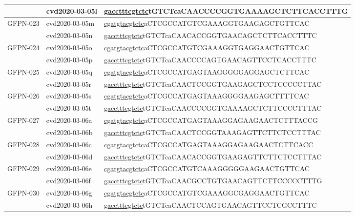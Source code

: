 \begin{landscape}
\begin{longtable}{|l|l|l|}
		& cvd2020-03-05l & \underline{gaccttt\underline{cgtctc}}tGTCTcaCAACCCCGGTGAAAAGCTCTTCACCTTTG  \\ \hline
		\multirow{2}{*}{GFPN-023} & cvd2020-03-05m & \underline{cgatgta\underline{cgtctc}}aCTCGCCATGTCGAAAGGTGAAGAGCTGTTCAC     \\ \cline{2-3} 
		& cvd2020-03-05n & \underline{gaccttt\underline{cgtctc}}tGTCTcaCAACACCGGTGAACAGCTCTTCACCTTTC  \\ \hline
		\multirow{2}{*}{GFPN-024} & cvd2020-03-05o & \underline{cgatgta\underline{cgtctc}}aCTCGCCATGTCGAAAGGTGAGGAACTGTTCAC     \\ \cline{2-3} 
		& cvd2020-03-05p & \underline{gaccttt\underline{cgtctc}}tGTCTcaCAACCCCAGTGAACAGTTCCTCACCTTTC  \\ \hline
		\multirow{2}{*}{GFPN-025} & cvd2020-03-05q & \underline{cgatgta\underline{cgtctc}}aCTCGCCATGAGTAAGGGGGAGGAGCTCTTCAC     \\ \cline{2-3} 
		& cvd2020-03-05r & \underline{gaccttt\underline{cgtctc}}tGTCTcaCAACTCCGGTGAAGAGCTCCTCCCCCTTAC \\ \hline
		\multirow{2}{*}{GFPN-026} & cvd2020-03-05s & \underline{cgatgta\underline{cgtctc}}aCTCGCCATGAGTAAAGGGGAAGAGCTTTTCAC     \\ \cline{2-3} 
		& cvd2020-03-05t & \underline{gaccttt\underline{cgtctc}}tGTCTcaCAACCCCGGTGAAAAGCTCTTCCCCTTTAC \\ \hline
		\multirow{2}{*}{GFPN-027} & cvd2020-03-06a & \underline{cgatgta\underline{cgtctc}}aCTCGCCATGAGTAAAGGAGAAGAACTCTTTACCG   \\ \cline{2-3} 
		& cvd2020-03-06b & \underline{gaccttt\underline{cgtctc}}tGTCTcaCAACTCCGGTAAAGAGTTCTTCTCCTTTAC \\ \hline
		\multirow{2}{*}{GFPN-028} & cvd2020-03-06c & \underline{cgatgta\underline{cgtctc}}aCTCGCCATGAGTAAAGGAGAAGAACTCTTCACC    \\ \cline{2-3} 
		& cvd2020-03-06d & \underline{gaccttt\underline{cgtctc}}tGTCTcaCAACACCGGTGAAGAGTTCTTCTCCTTTAC \\ \hline
		\multirow{2}{*}{GFPN-029} & cvd2020-03-06e & \underline{cgatgta\underline{cgtctc}}aCTCGCCATGTCAAAGGGGGAAGAACTGTTCAC     \\ \cline{2-3} 
		& cvd2020-03-06f & \underline{gaccttt\underline{cgtctc}}tGTCTcaCAACGCCTGTGAACAGTTCTTCCCCCTTTG \\ \hline
		\multirow{2}{*}{GFPN-030} & cvd2020-03-06g & \underline{cgatgta\underline{cgtctc}}aCTCGCCATGTCGAAAGGCGAGGAACTGTTCAC     \\ \cline{2-3} 
		& cvd2020-03-06h & \underline{gaccttt\underline{cgtctc}}tGTCTcaCAACTCCAGTGAACAGTTCCTCGCCTTTC  \\ \hline

\end{longtable}
\end{landscape}
